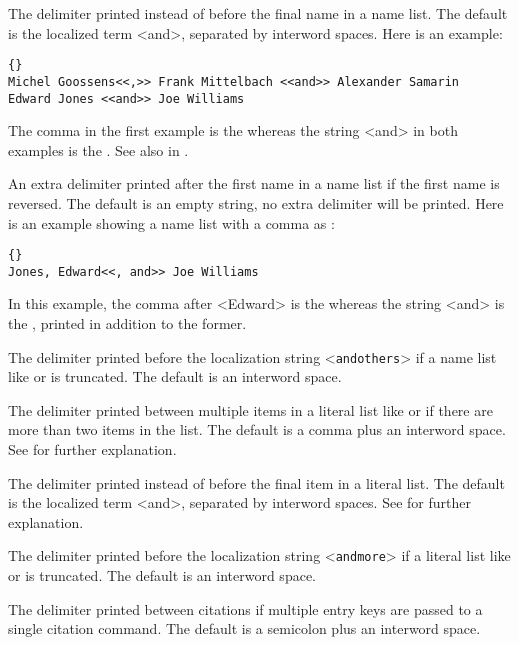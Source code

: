 \documentclass{ltxdockit}[2011/03/25]
\begin{document}
\begin{ltxsyntax}
The delimiter printed instead of  before the final name in a name list. The default is the localized term <and>, separated by interword spaces. Here is an example:

\begin{lstlisting}[style=latex]{}
Michel Goossens<<,>> Frank Mittelbach <<and>> Alexander Samarin
Edward Jones <<and>> Joe Williams
\end{lstlisting}
%
The comma in the first example is the  whereas the string <and> in both examples is the . See also  in .

An extra delimiter printed after the first name in a name list if the first name is reversed. The default is an empty string, \ie no extra delimiter will be printed. Here is an example showing a name list with a comma as :

\begin{lstlisting}[style=latex]{}
Jones, Edward<<, and>> Joe Williams
\end{lstlisting}
%
In this example, the comma after <Edward> is the  whereas the string <and> is the , printed in addition to the former.

The delimiter printed before the localization string <\texttt{andothers}> if a name list like  or  is truncated. The default is an interword space.

The delimiter printed between multiple items in a literal list like  or  if there are more than two items in the list. The default is a comma plus an interword space. See  for further explanation.

The delimiter printed instead of  before the final item in a literal list. The default is the localized term <and>, separated by interword spaces. See  for further explanation.

The delimiter printed before the localization string <\texttt{andmore}> if a literal list like  or  is truncated. The default is an interword space.

The delimiter printed between citations if multiple entry keys are passed to a single citation command. The default is a semicolon plus an interword space.


\end{ltxsyntax}
\end{document}
